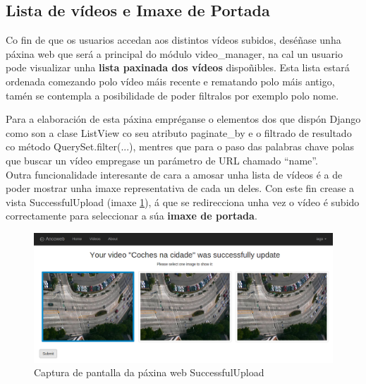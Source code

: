     \subsection{Lista de vídeos e Imaxe de Portada}
        
        Co fin de que os usuarios accedan aos distintos vídeos subidos, deséñase unha páxina web que será a
        principal do módulo video\_manager, na cal un usuario pode visualizar unha \textbf{ lista paxinada dos
        vídeos} dispoñibles. Esta lista estará ordenada comezando polo vídeo máis recente e rematando
        polo máis antigo, tamén se contempla a posibilidade de poder filtralos por exemplo polo nome.
        
        Para a elaboración de esta páxina empréganse o elementos dos que dispón Django como son a
        clase ListView co seu atributo paginate\_by e o filtrado de resultado co método 
        QuerySet.filter(...), mentres que para o paso das palabras chave polas que buscar un vídeo
        empregase un parámetro de URL chamado ``name''.\\
        
        Outra funcionalidade interesante de cara a amosar unha lista de vídeos é a de poder mostrar unha
        imaxe representativa de cada un deles. Con este fin crease a vista SuccessfulUpload (imaxe
        \ref{fig:SuccessfulUploadScreen}), á que se redirecciona unha vez o vídeo é subido correctamente
        para seleccionar a súa \textbf{imaxe de portada}.
        
        \begin{figure}[htp]
        \begin{center}
            \includegraphics[scale=0.35]{figures/SuccessfulUploadScreen.png}
            \caption{Captura de pantalla da páxina web SuccessfulUpload}
        \label{fig:SuccessfulUploadScreen}
        \end{center}
        \end{figure}
        

